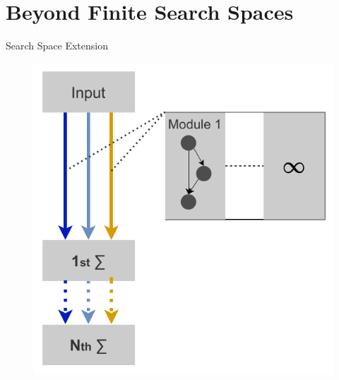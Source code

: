 \documentclass[]{beamer}
\begin{document}
\section{Beyond Finite Search Spaces}
\begin{frame}{Search Space Extension}
\vspace{10pt}
\vfill
\begin{figure}
    \begin{center}
    \includegraphics[scale=0.75]{graphics/search_space_extension.pdf}
    \caption{}
  \end{center} 
\end{figure}
\end{frame}
\end{document}
